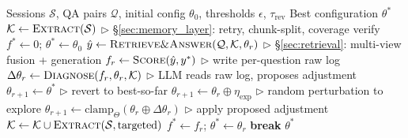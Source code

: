 \begin{algorithm}[!t]
\caption{\ours{} Self-Evolution Loop}
\label{alg:evolution}
\begin{algorithmic}[1]
\REQUIRE Sessions $\mathcal{S}$, QA pairs $\mathcal{Q}$, initial config $\theta_0$, thresholds $\epsilon$, $\tau_{\text{rev}}$
\ENSURE Best configuration $\theta^*$
\STATE $\mathcal{K} \leftarrow \textsc{Extract}(\mathcal{S})$ \hfill $\triangleright$ \S\ref{sec:memory_layer}: retry, chunk-split, coverage verify
\STATE $f^* \leftarrow 0$;\; $\theta^* \leftarrow \theta_0$
    \STATE $\hat{y} \leftarrow \textsc{Retrieve\&Answer}(\mathcal{Q}, \mathcal{K}, \theta_r)$ \hfill $\triangleright$ \S\ref{sec:retrieval}: multi-view fusion + generation
    \STATE $f_r \leftarrow \textsc{Score}(\hat{y}, y^*)$ \hfill $\triangleright$ write per-question raw log
    \STATE $\Delta\theta_r \leftarrow \textsc{Diagnose}(f_r, \theta_r, \mathcal{K})$ \hfill $\triangleright$ LLM reads raw log, proposes adjustment
        \STATE $\theta_{r+1} \leftarrow \theta^*$ \hfill $\triangleright$ revert to best-so-far
        \STATE $\theta_{r+1} \leftarrow \theta_r \oplus \eta_{\text{exp}}$ \hfill $\triangleright$ random perturbation to explore
    \ELSE
        \STATE $\theta_{r+1} \leftarrow \mathrm{clamp}_\Theta(\theta_r \oplus \Delta\theta_r)$ \hfill $\triangleright$ apply proposed adjustment
    \ENDIF
        \STATE $\mathcal{K} \leftarrow \mathcal{K} \cup \textsc{Extract}(\mathcal{S}, \text{targeted})$
    \ENDIF
        \STATE $f^* \leftarrow f_r$;\; $\theta^* \leftarrow \theta_r$
    \ENDIF
        \STATE \textbf{break}
    \ENDIF
\ENDFOR
\RETURN $\theta^*$
\end{algorithmic}
\end{algorithm}
